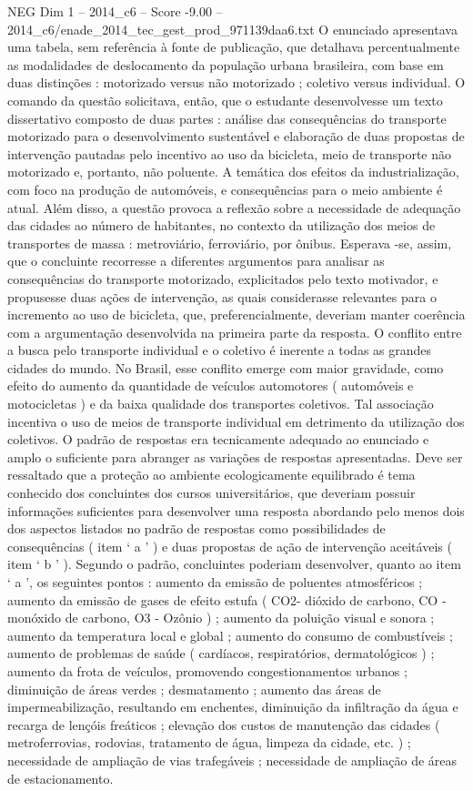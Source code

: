 \begin{textsample}{NEG Dim 1 – 2014\_c6 – Score -9.00 – 2014\_c6/enade\_2014\_tec\_gest\_prod\_971139daa6.txt}
O enunciado apresentava uma tabela, sem referência à fonte de publicação, que detalhava percentualmente as modalidades de deslocamento da população urbana brasileira, com base em duas distinções : motorizado versus não motorizado ; coletivo versus individual.
O comando da questão solicitava, então, que o estudante desenvolvesse um texto dissertativo composto de duas partes : análise das consequências do transporte motorizado para o desenvolvimento sustentável e elaboração de duas propostas de intervenção pautadas pelo incentivo ao uso da bicicleta, meio de transporte não motorizado e, portanto, não poluente.
A temática dos efeitos da industrialização, com foco na produção de automóveis, e consequências para o meio ambiente é atual.
Além disso, a questão provoca a reflexão sobre a necessidade de adequação das cidades ao número de habitantes, no contexto da utilização dos meios de transportes de massa : metroviário, ferroviário, por ônibus.
Esperava -se, assim, que o concluinte recorresse a diferentes argumentos para analisar as consequências do transporte motorizado, explicitados pelo texto motivador, e propusesse duas ações de intervenção, as quais considerasse relevantes para o incremento ao uso de bicicleta, que, preferencialmente, deveriam manter coerência com a argumentação desenvolvida na primeira parte da resposta.
O conflito entre a busca pelo transporte individual e o coletivo é inerente a todas as grandes cidades do mundo.
No Brasil, esse conflito emerge com maior gravidade, como efeito do aumento da quantidade de veículos automotores ( automóveis e motocicletas ) e da baixa qualidade dos transportes coletivos.
Tal associação incentiva o uso de meios de transporte individual em detrimento da utilização dos coletivos.
O padrão de respostas era tecnicamente adequado ao enunciado e amplo o suficiente para abranger as variações de respostas apresentadas.
Deve ser ressaltado que a proteção ao ambiente ecologicamente equilibrado é tema conhecido dos concluintes dos cursos universitários, que deveriam possuir informações suficientes para desenvolver uma resposta abordando pelo menos dois dos aspectos listados no padrão de respostas como possibilidades de consequências ( item ‘ a ’ ) e duas propostas de ação de intervenção aceitáveis ( item ‘ b ’ ).
Segundo o padrão, concluintes poderiam desenvolver, quanto ao item ‘ a ’, os seguintes pontos : aumento da emissão de poluentes atmosféricos ; aumento da emissão de gases de efeito estufa ( CO2- dióxido de carbono, CO - monóxido de carbono, O3 - Ozônio ) ; aumento da poluição visual e sonora ; aumento da temperatura local e global ; aumento do consumo de combustíveis ; aumento de problemas de saúde ( cardíacos, respiratórios, dermatológicos ) ; aumento da frota de veículos, promovendo congestionamentos urbanos ; diminuição de áreas verdes ; desmatamento ; aumento das áreas de impermeabilização, resultando em enchentes, diminuição da infiltração da água e recarga de lençóis freáticos ; elevação dos custos de manutenção das cidades ( metroferrovias, rodovias, tratamento de água, limpeza da cidade, etc. ) ; necessidade de ampliação de vias trafegáveis ; necessidade de ampliação de áreas de estacionamento.

\end{textsample}
